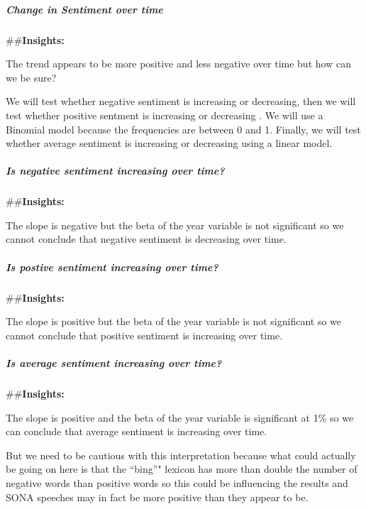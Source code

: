 \documentclass[]{article}
\let\oldsubparagraph\subparagraph
\renewcommand{\subparagraph}[1]{\oldsubparagraph{#1}\mbox{}}
\begin{document}
\hypertarget{change-in-sentiment-over-time}{%
\subparagraph{\texorpdfstring{\textbf{Change in Sentiment over
time}}{Change in Sentiment over time}}\label{change-in-sentiment-over-time}}

\#\#\textbf{Insights:}

The trend appears to be more positive and less negative over time but
how can we be sure?

We will test whether negative sentiment is increasing or decreasing,
then we will test whether positive sentment is increasing or decreasing
. We will use a Binomial model because the frequencies are between 0 and
1. Finally, we will test whether average sentiment is increasing or
decreasing using a linear model.

\hypertarget{is-negative-sentiment-increasing-over-time}{%
\subparagraph{\texorpdfstring{\textbf{Is negative sentiment increasing
over
time?}}{Is negative sentiment increasing over time?}}\label{is-negative-sentiment-increasing-over-time}}

\#\#\textbf{Insights:}

The slope is negative but the beta of the year variable is not
significant so we cannot conclude that negative sentiment is decreasing
over time.

\hypertarget{is-postive-sentiment-increasing-over-time}{%
\subparagraph{\texorpdfstring{\textbf{Is postive sentiment increasing
over
time?}}{Is postive sentiment increasing over time?}}\label{is-postive-sentiment-increasing-over-time}}

\#\#\textbf{Insights:}

The slope is positive but the beta of the year variable is not
significant so we cannot conclude that positive sentiment is increasing
over time.

\hypertarget{is-average-sentiment-increasing-over-time}{%
\subparagraph{\texorpdfstring{\textbf{Is average sentiment increasing
over
time?}}{Is average sentiment increasing over time?}}\label{is-average-sentiment-increasing-over-time}}

\#\#\textbf{Insights:}

The slope is positive and the beta of the year variable is significant
at 1\% so we can conclude that average sentiment is increasing over
time.

But we need to be cautious with this interpretation because what could
actually be going on here is that the ``bing''" lexicon has more than
double the number of negative words than positive words so this could be
influencing the results and SONA speeches may in fact be more positive
than they appear to be.
\end{document}
